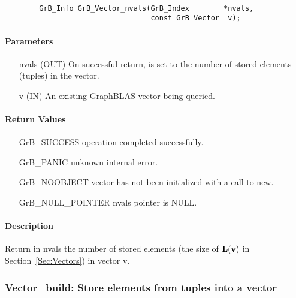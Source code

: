 \paragraph{\syntax}

\begin{verbatim}
        GrB_Info GrB_Vector_nvals(GrB_Index        *nvals,
                                  const GrB_Vector  v);
\end{verbatim}

\paragraph{Parameters}

\begin{itemize}[leftmargin=1.1in]
    \item[{\sf nvals}] ({\sf OUT}) On successful return, is set to the number of 
                                   stored elements (tuples) in the vector.
    \item[{\sf v}]     ({\sf IN})  An existing GraphBLAS vector being queried.
\end{itemize}


\paragraph{Return Values}

\begin{itemize}[leftmargin=2.1in]
\item[{\sf GrB\_SUCCESS}]   operation completed successfully.
\item[{\sf GrB\_PANIC}]     unknown internal error.
\item[{\sf GrB\_NOOBJECT}]  vector has not been initialized with a call to {\sf new}.
\item[{\sf GrB\_NULL\_POINTER}]    {\sf nvals} pointer is {\sf NULL}.
\end{itemize}

\paragraph{Description}

Return in {\sf nvals} the number of stored elements (the size of $\bold{L}({\bf v})$
in Section~\ref{Sec:Vectors}) in vector {\sf v}.


\subsubsection{{\sf Vector\_build}: Store elements from tuples into a vector}
\label{Sec:Vector_build}

